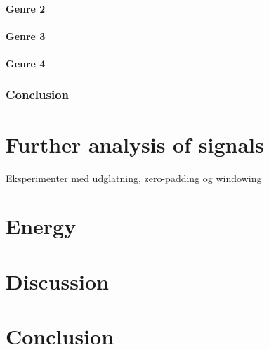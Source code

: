 \paragraph{Genre 2}

\paragraph{Genre 3}

\paragraph{Genre 4}

\subsubsection{Conclusion}

\section{Further analysis of signals}
Eksperimenter med udglatning, zero-padding og windowing 

\section{Energy}

\section{Discussion}

\section{Conclusion}
